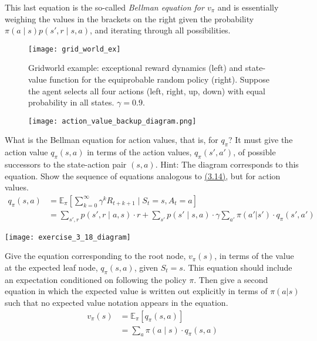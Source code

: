 This last equation is the so-called \textit{Bellman equation for $v_{\pi}$} and is essentially
weighing the values in the brackets on the right given the probability \newline
\mbox{$\pi(a\mid s)p(s',r\mid s, a)$}, and iterating through all possibilities.

\begin{figure}[h]
    \centering
    \texttt{[image: grid\_world\_ex]}
    \caption{Gridworld example: exceptional reward dynamics (left) and state-value function
    for the equiprobable random policy (right).
    Suppose the agent selects all four actions (left, right, up, down) with equal
    probability in all states.
    $\gamma=0.9$.}
    \label{fig:3.2}
\end{figure}

\begin{exercise}{3.17}
    \begin{wrapfigure}{r}{0.3\linewidth}
        \centering
        \texttt{[image: action\_value\_backup\_diagram.png]}
    \end{wrapfigure}
    What is the Bellman equation for action values, that is, for $q_{\pi}$?
    It must give the action value $q_{\pi}(s, a)$ in terms of the action
    values, $q_{\pi}(s',a')$, of possible successors to the state-action pair $(s, a)$.
    Hint: The diagram corresponds to this equation.
    Show the sequence of equations analogous to \hyperref[eq:3.14]{(3.14)}, but for action
    values.
    \[
        \begin{aligned}
            q_{\pi}(s,a)
            &=\mathbb{E}_{\pi}\left[\sum_{k=0}^{\infty}\gamma^k R_{t+k+1} \mid S_t=s, A_t=a\right]\\
            &=\sum_{s',r}p(s',r\mid a, s)\cdot r
            + \sum_{s'}p(s'\mid s,a)\cdot\gamma\sum_{a'}\pi (a'|s')\cdot q_{\pi}(s',a')
        \end{aligned}
    \]
\end{exercise}

\begin{exercise}{3.18}
    \begin{center}
        \texttt{[image: exercise\_3\_18\_diagram]}
    \end{center}
    Give the equation corresponding to the root node, $v_{\pi}(s)$, in terms of the
    value at the expected leaf node, $q_{\pi}(s, a)$, given $S_t=s$.
    This equation should include an expectation conditioned on following the policy $\pi$.
    Then give a second equation in which the expected value is written out explicitly
    in terms of $\pi(a|s)$ such that no expected value notation appears in the equation.
    \[
        \begin{aligned}
            v_{\pi}(s)&=\mathbb{E}_{\pi}\left[q_{\pi}(s,a)\right]\\
            &=\sum_{a}\pi(a\mid s)\cdot q_{\pi}(s,a)
        \end{aligned}
    \]
\end{exercise}

